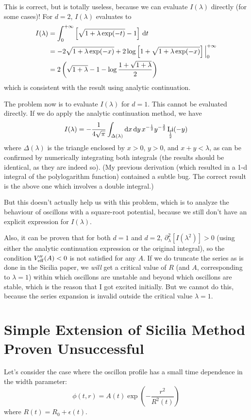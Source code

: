 \documentclass{report}
\DeclareMathOperator{\Li}{Li}
\begin{document}
This is correct, but is totally useless, because we can evaluate $I(\lambda)$ directly (for some cases)! For $d=2$, $I(\lambda)$ evaluates to
\begin{equation}
  \begin{split}
  I(\lambda) &= \int^{+\infty}_0 \left[\sqrt{1+\lambda \exp(-t)} -1\right]\,{\rm d}t\\
  &= -2\sqrt{1+\lambda\exp(-x)} + 2\log\left[1+\sqrt{1+\lambda\exp(-x)}\right]\Big|^{+\infty}_0\\
  &= 2\left(\sqrt{1+\lambda} -1 -\log\frac{1+\sqrt{1+\lambda}}{2}\right)
  \end{split}
\end{equation}
which is consistent with the result using analytic continuation.

The problem now is to evaluate $I(\lambda)$ for $d=1$. This cannot be evaluated directly. If we do apply the analytic continuation method, we have
\begin{equation}
  I(\lambda) = -\frac{1}{4\sqrt{\pi}}\int_{\Delta(\lambda)}{\rm d}x\,{\rm d}y\,x^{-\frac{1}{2}}y^{-\frac{3}{2}}\Li_{\frac{1}{2}}(-y)
\end{equation}
where $\Delta(\lambda)$ is the triangle enclosed by $x>0$, $y>0$, and $x+y<\lambda$, as can be confirmed by numerically integrating both integrals (the results should be identical, as they are indeed so). (My previous derivation (which resulted in a 1-d integral of the polylogarithm function) contained a subtle bug. The correct result is the above one which involves a double integral.)

But this doesn't actually help us with this problem, which is to analyze the behaviour of oscillons with a square-root potential, because we still don't have an explicit expression for $I(\lambda)$.

Also, it can be proven that for both $d=1$ and $d=2$, $\partial^2_\lambda[I(\lambda^2)] > 0$ (using either the analytic continuation expression or the original integral), so the condition $V_{\rm eff}''(A)<0$ is not satisfied for any $A$. If we do truncate the series as is done in the Sicilia paper, we \emph{will} get a critical value of $R$ (and $A$, corresponding to $\lambda = 1$) within which oscillons are unstable and beyond which oscillons are stable, which is the reason that I got excited initially. But we cannot do this, because the series expansion is invalid outside the critical value $\lambda = 1$.

\section{Simple Extension of Sicilia Method Proven Unsuccessful}
Let's consider the case where the oscillon profile has a small time dependence in the width parameter:
\begin{equation}
  \phi(t,r) = A(t) \exp \left(-\frac{r^2}{R^2(t)}\right )
\end{equation}
where $R(t) = R_0 + \epsilon(t)$.
\end{document}
